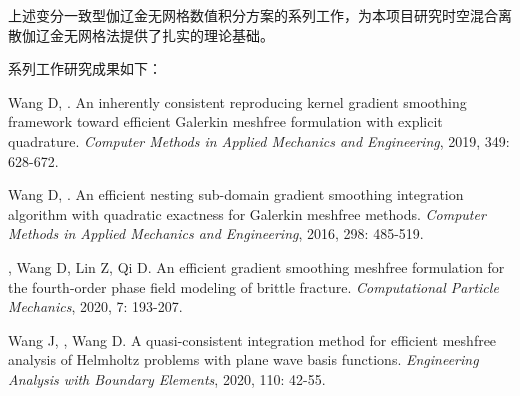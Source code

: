 上述变分一致型伽辽金无网格数值积分方案的系列工作，为本项目研究时空混合离散伽辽金无网格法提供了扎实的理论基础。

系列工作研究成果如下：

\vspace{-50pt}
\begin{thebibliography}{1}
	\providecommand{\bibauthor}[1]{#1}
	\providecommand{\bibeditor}[1]{#1}
	\providecommand{\bibtranslator}[1]{#1}
	\providecommand{\bibtitle}[1]{#1}
	\providecommand{\bibbooktitle}[1]{#1}
	\providecommand{\bibjournal}[1]{#1}
	\providecommand{\bibmark}[1]{#1}
	\providecommand{\bibcountry}[1]{#1}
	\providecommand{\bibpatentid}[1]{#1}
	\providecommand{\bibedition}[1]{#1}
	\providecommand{\biborganization}[1]{#1}
	\providecommand{\bibaddress}[1]{#1}
	\providecommand{\bibpublisher}[1]{#1}
	\providecommand{\bibinstitution}[1]{#1}
	\providecommand{\bibschool}[1]{#1}
	\providecommand{\bibvolume}[1]{#1}
	\providecommand{\bibnumber}[1]{#1}
	\providecommand{\bibversion}[1]{#1}
	\providecommand{\bibpages}[1]{#1}
	\providecommand{\bibmodifydate}[1]{#1}
	\providecommand{\bibcitedate}[1]{#1}
	\providecommand{\bibyear}[1]{#1}
	\providecommand{\bibdate}[1]{#1}
	\providecommand{\biburl}[1]{\newline\url{#1}}

	Wang D, .
	\newblock An inherently consistent reproducing kernel gradient smoothing
	  framework toward efficient {{Galerkin}} meshfree formulation with explicit
	  quadrature.
	\newblock \emph{Computer Methods in Applied Mechanics and Engineering}, 2019,
	  349: 628-672.

	Wang D, .
	\newblock An efficient nesting sub-domain gradient smoothing integration
	  algorithm with quadratic exactness for {{Galerkin}} meshfree methods.
	\newblock \emph{Computer Methods in Applied Mechanics and Engineering}, 2016,
	  298: 485-519.

	, Wang D, Lin Z, Qi D.
	\newblock An efficient gradient smoothing meshfree formulation for the
	  fourth-order phase field modeling of brittle fracture.
	\newblock \emph{Computational Particle Mechanics}, 2020, 7: 193-207.

	Wang J, , Wang D.
	\newblock A quasi-consistent integration method for efficient meshfree analysis
	  of {{Helmholtz}} problems with plane wave basis functions.
	\newblock \emph{Engineering Analysis with Boundary Elements}, 2020, 110: 42-55.


\end{thebibliography}
